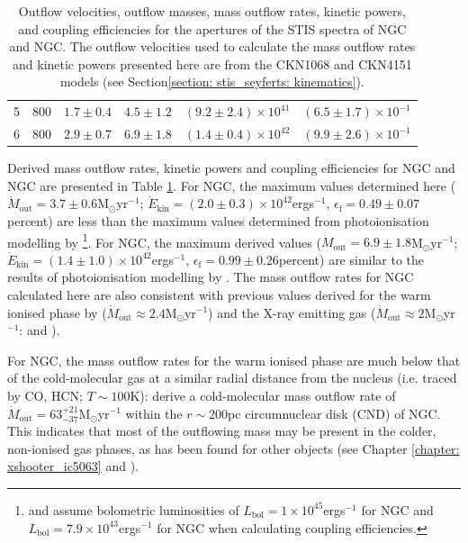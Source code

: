 \begin{table}
\begin{tabular}{cccccc}
    5 & 800 & $1.7\pm0.4$ & $4.5\pm1.2$ & $(9.2\pm2.4)\times10^{41}$ & $(6.5\pm1.7)\times10^{-1}$ \\
    6 & 800 & $2.9\pm0.7$ & $6.9\pm1.8$ & $(1.4\pm0.4)\times10^{42}$ & $(9.9\pm2.6)\times10^{-1}$    \\ 
    \end{tabular}
    \caption[Outflow velocities, outflow masses, mass outflow rates, kinetic powers, and coupling efficiencies for the apertures of the STIS spectra of NGC and NGC.]{Outflow velocities, outflow masses, mass outflow rates, kinetic powers, and coupling efficiencies for the apertures of the STIS spectra of NGC and NGC. The outflow velocities used to calculate the mass outflow rates and kinetic powers presented here are from the CKN1068 and CKN4151 models (see Section\;\ref{section: stis_seyferts: kinematics}).}
    \label{tab: energetics}
\end{table}

Derived mass outflow rates, kinetic powers and coupling efficiencies for NGC and NGC are presented in Table \ref{tab: energetics}. For NGC, the maximum values determined here ($\dot{M}_\mathrm{out}=3.7\pm0.6$\;M$_\odot$\;yr$^{-1}$; $\dot{E}_\mathrm{kin}=(2.0\pm0.3)\times10^{42}$\;erg\;s$^{-1}$, $\epsilon_\mathrm{f}=0.49\pm0.07$\;per\;cent) are less than the maximum values determined from photoionisation modelling by \citet{Revalski2021}\footnote{\citet{Crenshaw2015} and \citet{Revalski2021} assume bolometric luminosities of $L_\mathrm{bol}=1\times10^{45}$\;erg\;s$^{-1}$ for NGC and $L_\mathrm{bol}=7.9\times10^{43}$\;erg\;s$^{-1}$ for NGC when calculating coupling efficiencies.}. For NGC, the maximum derived values ($\dot{M}_\mathrm{out}=6.9\pm1.8$\;M$_\odot$\;yr$^{-1}$; $\dot{E}_\mathrm{kin}=(1.4\pm1.0)\times10^{42}$\;erg\;s$^{-1}$,  $\epsilon_\mathrm{f}=0.99\pm0.26$\;per\;cent) are similar to the results of photoionisation modelling by \citet{Crenshaw2015}. The mass outflow rates for NGC calculated here are also consistent with previous values derived for the warm ionised phase by \citet{Storchi-Bergmann2010} ($\dot{M}_\mathrm{out}\approx2.4$\;M$_\odot$\;yr$^{-1}$) and the X-ray emitting gas ($\dot{M}_\mathrm{out}\approx2$\;M$_\odot$\;yr$^{-1}$: \citealt{Wang2011} and \citealt{Kraemer2020}).

For NGC, the mass outflow rates for the warm ionised phase are much below that of the cold-molecular gas at a similar radial distance from the nucleus (i.e. traced by CO, HCN; $T\sim100$\;K): \citet{GarciaBurillo2014} derive a cold-molecular mass outflow rate of $\dot{M}_\mathrm{out}=63^{+21}_{-37}$\;M$_\odot$\;yr$^{-1}$ within the $r\sim200$\;pc circumnuclear disk (CND) of NGC. This indicates that most of the outflowing mass may be present in the colder, non-ionised gas phases, as has been found for other objects (see Chapter \ref{chapter: xshooter_ic5063} and \citealt{RamosAlmeida2019}).


